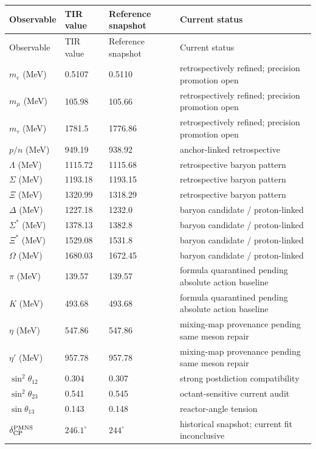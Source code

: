 \begin{longtable}{p{}p{}p{}p{}}
\toprule
Observable & TIR value & Reference snapshot & Current status\\
\midrule
\endfirsthead
\toprule
Observable & TIR value & Reference snapshot & Current status\\
\midrule
\endhead
$m_e$ (MeV) & 0.5107 & 0.5110 & retrospectively refined; precision promotion open\\
$m_\mu$ (MeV) & 105.98 & 105.66 & retrospectively refined; precision promotion open\\
$m_\tau$ (MeV) & 1781.5 & 1776.86 & retrospectively refined; precision promotion open\\
\midrule
$p/n$ (MeV) & 949.19 & 938.92 & anchor-linked retrospective\\
$\Lambda$ (MeV) & 1115.72 & 1115.68 & retrospective baryon pattern\\
$\Sigma$ (MeV) & 1193.18 & 1193.15 & retrospective baryon pattern\\
$\Xi$ (MeV) & 1320.99 & 1318.29 & retrospective baryon pattern\\
$\Delta$ (MeV) & 1227.18 & 1232.0 & baryon candidate / proton-linked\\
$\Sigma^*$ (MeV) & 1378.13 & 1382.8 & baryon candidate / proton-linked\\
$\Xi^*$ (MeV) & 1529.08 & 1531.8 & baryon candidate / proton-linked\\
$\Omega$ (MeV) & 1680.03 & 1672.45 & baryon candidate / proton-linked\\
\midrule
$\pi$ (MeV) & 139.57 & 139.57 & formula quarantined pending absolute action baseline\\
$K$ (MeV) & 493.68 & 493.68 & formula quarantined pending absolute action baseline\\
$\eta$ (MeV) & 547.86 & 547.86 & mixing-map provenance pending same meson repair\\
$\eta'$ (MeV) & 957.78 & 957.78 & mixing-map provenance pending same meson repair\\
\midrule
$\sin^2\theta_{12}$ & 0.304 & 0.307 & strong postdiction compatibility\\
$\sin^2\theta_{23}$ & 0.541 & 0.545 & octant-sensitive current audit\\
$\sin\theta_{13}$ & 0.143 & 0.148 & reactor-angle tension\\
$\delta_{\rm CP}^{\rm PMNS}$ & $246.1^\circ$ & $244^\circ$ & historical snapshot; current fit inconclusive\\

\end{longtable}
